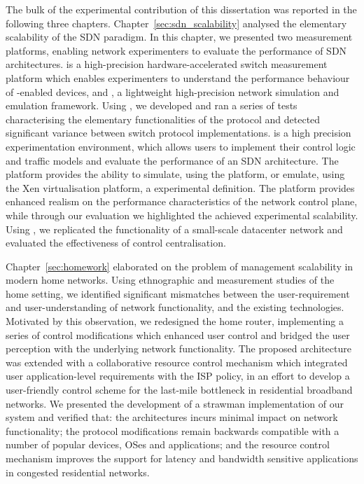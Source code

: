 The bulk of the experimental contribution of this dissertation was reported in
the following three chapters. Chapter~\ref{sec:sdn_scalability} analysed the
elementary scalability of the SDN paradigm. In this chapter, we presented two
measurement platforms, enabling network experimenters to evaluate the
performance of SDN architectures. \oflops is a high-precision
hardware-accelerated \of switch measurement platform which enables
experimenters to understand the performance behaviour of \of-enabled devices,
and \sdnsim, a lightweight high-precision network simulation and emulation
framework. Using \oflops, we developed and ran a series of tests characterising
the elementary functionalities of the \of protocol and detected significant
variance between switch protocol implementations. \sdnsim is a high precision
experimentation environment, which allows users to implement their control
logic and traffic models and evaluate the performance of an SDN architecture.
The platform provides the ability to simulate, using the  platform, or
emulate, using the Xen virtualisation platform, a experimental definition.  The
platform provides enhanced realism on the performance characteristics of the
network control plane, while through our evaluation we highlighted the achieved
experimental scalability. Using \sdnsim, we replicated the functionality of a
small-scale datacenter network and evaluated the effectiveness of control
centralisation.

Chapter~\ref{sec:homework} elaborated on the problem of management scalability in
modern home networks. Using ethnographic and measurement studies of the home
setting, we identified significant mismatches between the user-requirement and
user-understanding of network functionality, and the existing technologies.
Motivated by this observation, we redesigned the home router, implementing a
series of control modifications which enhanced user control and bridged the user
perception with the underlying network functionality. The proposed architecture
was extended with a collaborative resource control mechanism which integrated
user application-level requirements with the ISP policy, in an effort to
develop a user-friendly control scheme for the last-mile bottleneck in
residential broadband networks. We presented the development of a strawman
implementation of our system and verified that: the architectures incurs minimal
impact on network functionality; the protocol modifications remain
backwards compatible with a number of popular devices, OSes and applications; and
 the resource control mechanism improves the support for latency and
bandwidth sensitive applications in congested residential networks. 

